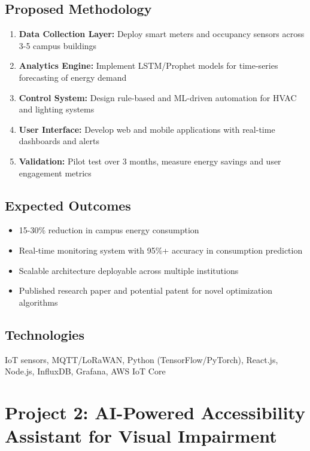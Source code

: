 \documentclass[12pt,a4paper]{article}
\begin{document}
\subsection{Proposed Methodology}
\begin{enumerate}[leftmargin=*]
    \item \textbf{Data Collection Layer:} Deploy smart meters and occupancy sensors across 3-5 campus buildings
    \item \textbf{Analytics Engine:} Implement LSTM/Prophet models for time-series forecasting of energy demand
    \item \textbf{Control System:} Design rule-based and ML-driven automation for HVAC and lighting systems
    \item \textbf{User Interface:} Develop web and mobile applications with real-time dashboards and alerts
    \item \textbf{Validation:} Pilot test over 3 months, measure energy savings and user engagement metrics
\end{enumerate}

\subsection{Expected Outcomes}
\begin{itemize}[leftmargin=*]
    \item 15-30\% reduction in campus energy consumption
    \item Real-time monitoring system with 95\%+ accuracy in consumption prediction
    \item Scalable architecture deployable across multiple institutions
    \item Published research paper and potential patent for novel optimization algorithms
\end{itemize}

\subsection{Technologies}
IoT sensors, MQTT/LoRaWAN, Python (TensorFlow/PyTorch), React.js, Node.js, InfluxDB, Grafana, AWS IoT Core

\newpage

\section{Project 2: AI-Powered Accessibility Assistant for Visual Impairment}
\end{document}
